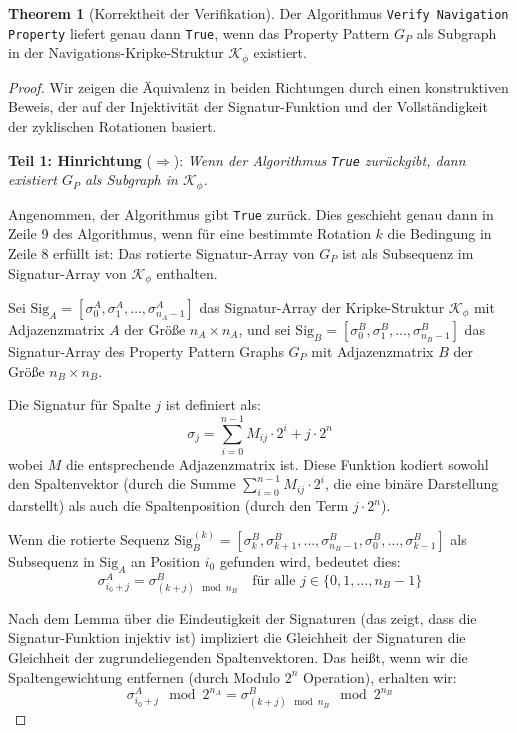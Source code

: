 ﻿\documentclass[a4paper,12pt]{article}
\theoremstyle{definition}
\newtheorem{theorem}{Theorem}[section]
\begin{document}
\begin{theorem}[Korrektheit der Verifikation]
Der Algorithmus \texttt{Verify Navigation Property} liefert genau dann \texttt{True}, wenn das Property Pattern $G_P$ als Subgraph in der Navigations-Kripke-Struktur $\mathcal{K}_{\phi}$ existiert.
\end{theorem}

\begin{proof}
Wir zeigen die Äquivalenz in beiden Richtungen durch einen konstruktiven Beweis, der auf der Injektivität der Signatur-Funktion und der Vollständigkeit der zyklischen Rotationen basiert.

\textbf{Teil 1: Hinrichtung} ($\Rightarrow$): \textit{Wenn der Algorithmus \texttt{True} zurückgibt, dann existiert $G_P$ als Subgraph in $\mathcal{K}_{\phi}$.}

Angenommen, der Algorithmus gibt \texttt{True} zurück. Dies geschieht genau dann in Zeile 9 des Algorithmus, wenn für eine bestimmte Rotation $k$ die Bedingung in Zeile 8 erfüllt ist: Das rotierte Signatur-Array von $G_P$ ist als Subsequenz im Signatur-Array von $\mathcal{K}_{\phi}$ enthalten.

Sei $\text{Sig}_A = [\sigma_0^A, \sigma_1^A, \ldots, \sigma_{n_A-1}^A]$ das Signatur-Array der Kripke-Struktur $\mathcal{K}_{\phi}$ mit Adjazenzmatrix $A$ der Größe $n_A \times n_A$, und sei $\text{Sig}_B = [\sigma_0^B, \sigma_1^B, \ldots, \sigma_{n_B-1}^B]$ das Signatur-Array des Property Pattern Graphs $G_P$ mit Adjazenzmatrix $B$ der Größe $n_B \times n_B$.

Die Signatur für Spalte $j$ ist definiert als:
\begin{equation}
\sigma_j = \sum_{i=0}^{n-1} M_{ij} \cdot 2^i + j \cdot 2^n
\end{equation}
wobei $M$ die entsprechende Adjazenzmatrix ist. Diese Funktion kodiert sowohl den Spaltenvektor (durch die Summe $\sum_{i=0}^{n-1} M_{ij} \cdot 2^i$, die eine binäre Darstellung darstellt) als auch die Spaltenposition (durch den Term $j \cdot 2^n$).

Wenn die rotierte Sequenz $\text{Sig}_B^{(k)} = [\sigma_k^B, \sigma_{k+1}^B, \ldots, \sigma_{n_B-1}^B, \sigma_0^B, \ldots, \sigma_{k-1}^B]$ als Subsequenz in $\text{Sig}_A$ an Position $i_0$ gefunden wird, bedeutet dies:
\begin{equation}
\sigma_{i_0+j}^A = \sigma_{(k+j) \mod n_B}^B \quad \text{für alle } j \in \{0, 1, \ldots, n_B-1\}
\end{equation}

Nach dem Lemma über die Eindeutigkeit der Signaturen (das zeigt, dass die Signatur-Funktion injektiv ist) impliziert die Gleichheit der Signaturen die Gleichheit der zugrundeliegenden Spaltenvektoren. Das heißt, wenn wir die Spaltengewichtung entfernen (durch Modulo $2^n$ Operation), erhalten wir:
\begin{equation}
\sigma_{i_0+j}^A \mod 2^{n_A} = \sigma_{(k+j) \mod n_B}^B \mod 2^{n_B}
\end{equation}


\end{proof}
\end{document}
